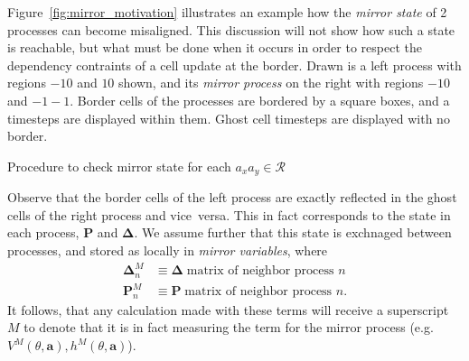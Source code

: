 Figure~\ref{fig:mirror_motivation} illustrates an example how the {\it mirror state}
of 2 processes can become misaligned.  This discussion will not show how such a state
is reachable, but what must be done when it occurs in order to respect the dependency
contraints of a cell update at the border.
Drawn is a left process with regions $-10$ and $10$ shown,
and its {\it mirror process} on the right with regions $-10$ and $-1-1$.  Border cells
of the processes are bordered by a square boxes, and a timesteps are displayed within them.
Ghost cell timesteps are displayed with no border.
\begin{algorithm}[h]
  \setcounter{AlgoLine}{0}
  \caption{Procedure to check mirror state for each
  $a_xa_y \in \mathcal{R}$}
  \label{alg:mirror_guard}
\end{algorithm}
Observe that the border cells
of the left process are exactly reflected in the ghost cells of the right process and
vice~versa.  This in fact corresponds to the state in each process, $\mathbf{P}$ and
$\mathbf{\Delta}$.  We assume further that this state is exchnaged between processes,
and stored as locally in {\it mirror variables}, where
\begin{eqnarray}
  \mathbf{\Delta}_n^M &\equiv \mathbf{\Delta}\;\text{matrix of neighbor process $n$}\\
  \mathbf{P}_n^M &\equiv \mathbf{P}\;\text{matrix of neighbor process $n$}.
\end{eqnarray}
It follows, that any calculation made with these terms will receive a superscript $M$
to denote that it is in fact measuring the term for the mirror process (e.g.
$V^M(\theta, \mathbf{a}), h^M(\theta, \mathbf{a})$).

